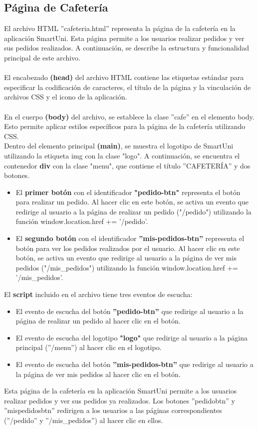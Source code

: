 \documentclass[12pt]{report}
\begin{document}
\subsection{Página de Cafetería}
El archivo HTML ''cafeteria.html'' representa la página de la cafetería en la aplicación SmartUni. Esta página permite a los usuarios realizar pedidos y ver sus pedidos realizados. A continuación, se describe la estructura y funcionalidad principal de este archivo.
\\\\
El encabezado \textbf{(head)} del archivo HTML contiene las etiquetas estándar para especificar la codificación de caracteres, el título de la página y la vinculación de archivos CSS y el icono de la aplicación.
\\\\En el cuerpo \textbf{(body)} del archivo, se establece la clase ''cafe'' en el elemento body. Esto permite aplicar estilos específicos para la página de la cafetería utilizando CSS.
\\Dentro del elemento principal \textbf{(main)}, se muestra el logotipo de SmartUni utilizando la etiqueta img con la clase "logo". A continuación, se encuentra el contenedor \textbf{div} con la clase "menu", que contiene el título ''CAFETERÍA'' y dos botones.
    \begin{itemize}
        \item El\textbf{ primer botón} con el identificador \textbf{"pedido-btn"} representa el botón para realizar un pedido. Al hacer clic en este botón, se activa un evento que redirige al usuario a la página de realizar un pedido ("/pedido") utilizando la función window.location.href += '/pedido'.
        
        \item El \textbf{segundo botón }con el identificador \textbf{''mis-pedidos-btn'' }representa el botón para ver los pedidos realizados por el usuario. Al hacer clic en este botón, se activa un evento que redirige al usuario a la página de ver mis pedidos ("/mis\_pedidos") utilizando la función window.location.href += '/mis\_pedidos'.
    \end{itemize}
El \textbf{script } incluido en el archivo tiene tres eventos de escucha:
    \begin{itemize}
        \item El evento de escucha del botón \textbf{''pedido-btn''} que redirige al usuario a la página de realizar un pedido al hacer clic en el botón.
        \item El evento de escucha del logotipo \textbf{"logo"} que redirige al usuario a la página principal (''/menu'') al hacer clic en el logotipo.
        \item El evento de escucha del botón \textbf{''mis-pedidos-btn''} que redirige al usuario a la página de ver mis pedidos al hacer clic en el botón.
    \end{itemize}
Esta página de la cafetería en la aplicación SmartUni permite a los usuarios realizar pedidos y ver sus pedidos ya realizados. Los botones ''pedido\-btn'' y ''mis\-pedidos\-btn'' redirigen a los usuarios a las páginas correspondientes (''/pedido'' y ''/mis\_pedidos'') al hacer clic en ellos.
\end{document}

